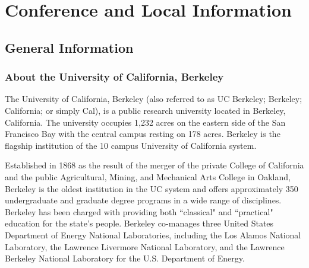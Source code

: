 \chapter{Conference and Local Information}

\setlength\fboxsep{0pt}
\setlength\fboxrule{0.5pt}



\vspace{-0.5cm}
 \section{General Information}
\vspace{0.2cm}

\subsection*{About the University of California, Berkeley}

The University of California, Berkeley (also referred to as UC Berkeley; Berkeley; California; or simply Cal), is a public research university located in Berkeley, California. The university occupies 1,232 acres on the eastern side of the San Francisco Bay with the central campus resting on 178 acres. Berkeley is the flagship institution of the 10 campus University of California system.

Established in 1868 as the result of the merger of the private College of California and the public Agricultural, Mining, and Mechanical Arts College in Oakland, Berkeley is the oldest institution in the UC system and offers approximately 350 undergraduate and graduate degree programs in a wide range of disciplines. Berkeley has been charged with providing both ``classical" and ``practical" education for the state's people. Berkeley co-manages three United States Department of Energy National Laboratories, including the Los Alamos National Laboratory, the Lawrence Livermore National Laboratory, and the Lawrence Berkeley National Laboratory for the U.S. Department of Energy.

